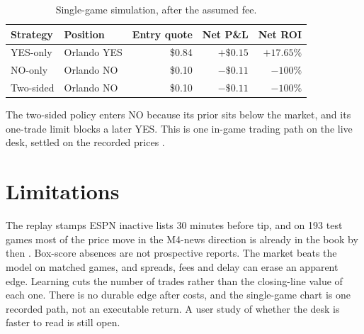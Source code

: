 \documentclass[11pt,a4paper]{article}
\begin{document}
\begin{table}[h]
\centering\small
\caption{Single-game simulation, after the assumed fee.}
\label{tab:inplay_trading}
\begin{tabular}{llrrr}
\toprule
Strategy & Position & Entry quote & Net P\&L & Net ROI\\
\midrule
YES-only & Orlando YES & \$0.84 & $+\$0.15$ & $+17.65\%$\\
NO-only & Orlando NO & \$0.10 & $-\$0.11$ & $-100\%$\\
Two-sided & Orlando NO & \$0.10 & $-\$0.11$ & $-100\%$\\
\bottomrule
\end{tabular}
\end{table}

The two-sided policy enters NO because its prior sits below the market, and
its one-trade limit blocks a later YES. This is one in-game trading path on
the live desk, settled on the recorded prices \cite{section5-case}.

\section{Limitations}
The replay stamps ESPN inactive lists 30 minutes before tip, and on 193 test
games most of the price move in the M4-news direction is already in the book
by then \cite{injury-timing,fairness}. Box-score absences are not prospective
reports. The market beats the model on matched games, and spreads, fees and
delay can erase an apparent edge. Learning cuts the number of trades rather
than the closing-line value of each one. There is no durable edge after
costs, and the single-game chart is one recorded path, not an executable
return. A user study of whether the desk is faster to read is still open.
\end{document}

